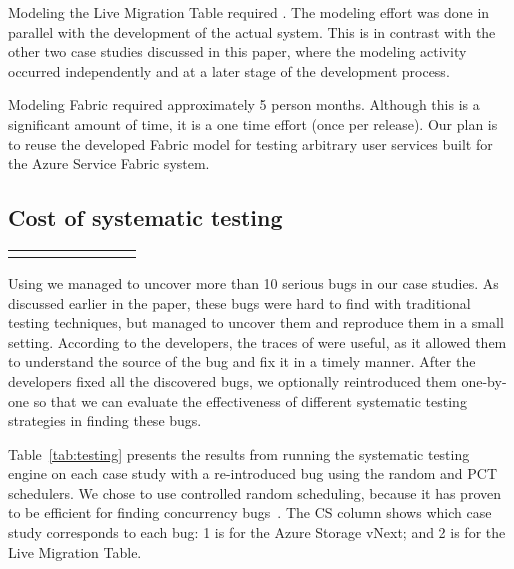 Modeling the Live Migration Table required . The modeling effort was done in parallel with the development of the actual system. 
This is in contrast with the other two case studies discussed in this paper, where the modeling 
activity occurred independently and at a later stage of the development process.

Modeling Fabric required approximately 5 person months. Although this is a
significant amount of time, it is a one time effort (once per release). Our plan is to reuse the developed Fabric model 
for testing arbitrary user services built for the Azure Service Fabric system.

\subsection{Cost of systematic testing}
\label{sec:eval:machine_cost}

\setlength{\tabcolsep}{.72em}
\begin{table*}[t]
\small
\centering
\begin{tabular}{rl rrr rrr}
\centering

\end{tabular}
\caption{Results from running the \psharp random and PCT systematic testing schedulers for 100,000 iterations. We report: time in seconds to find a bug (Time to Bug); number of scheduling steps when a bug was found (\#SS); and if a bug was found with a particular scheduler (BF?).}
\label{tab:testing}
\end{table*}

Using \psharp we managed to uncover more than 10 serious bugs in our case studies. As discussed earlier in the paper, these bugs were hard to find with traditional testing techniques, but \psharp managed to uncover them and reproduce them in a small setting. According to the developers, the traces of \psharp were useful, as it allowed them to understand the source of the bug and fix it in a timely manner. After the developers fixed all the discovered bugs, we optionally reintroduced them one-by-one so that we can evaluate the effectiveness of different \psharp systematic testing strategies in finding these bugs.

Table~\ref{tab:testing} presents the results from running the \psharp systematic testing engine on each case study with a re-introduced bug using the random and PCT schedulers. We chose to use controlled random scheduling, because it has proven to be efficient for finding concurrency bugs~\cite{thomson2014sct, deligiannis2015psharp}. The CS column shows which case study corresponds to each bug: 1 is for the Azure Storage vNext; and 2 is for the Live Migration Table. 

